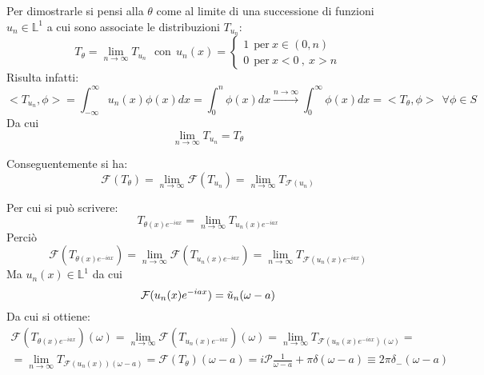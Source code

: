 \documentclass[twoside]{article}
\begin{document}
Per dimostrarle si pensi alla $\theta$ come al limite di una successione di funzioni $u_n \in \mathds{L}^1$ a cui sono associate le distribuzioni $T_{u_{n}}$:
\begin{equation}
    T_{\theta}=\lim_{n\to \infty}T_{u_{n}} \ \ \ \text{con} \ \ u_n(x)= \left\{ \begin{array}{lr}
         1 \ \ \text{per} \ x \in (0,n)  \\
         0 \ \ \text{per} \ x<0 \ , \ x>n
    \end{array}\right.
\end{equation}
Risulta infatti:
\begin{equation}
    <T_{u_{n}},\phi>=\int_{-\infty}^{\infty}u_n(x)\phi(x)dx=\int_{0}^{n}\phi(x)dx \xrightarrow{n \to \infty}\int_0 ^{\infty}\phi(x)dx=<T_{\theta},\phi> \ \ \forall \phi \in S
\end{equation}
Da cui 
\begin{equation}
    \lim_{n\to \infty}T_{u_{n}}=T_{\theta}
\end{equation}

Conseguentemente si ha:
\begin{equation}
    \mathcal{F}(T_{\theta})=\lim_{n\to \infty}\mathcal{F}(T_{u_{n}})=\lim_{n\to \infty}T_{\mathcal{F}(u_{n})}
\end{equation}

Per cui si può scrivere:
\begin{equation}
    T_{\theta(x)e^{-iax}}=\lim_{n\to \infty}T_{u_n(x)e^{-iax}}
\end{equation}
Perciò
\begin{equation}
    \mathcal{F}(T_{\theta(x)e^{-iax}})=\lim_{n\to \infty}\mathcal{F}(T_{u_n(x)e^{-iax}})=\lim_{n\to \infty}T_{\mathcal{F}(u_n(x)e^{-iax})}
\end{equation}
Ma $u_n(x) \in \mathds{L}^1$ da cui
\begin{equation}
    \mathcal{F}(u_n(x)e^{-iax})=\Tilde{u}_n(\omega-a)
\end{equation}
Da cui si ottiene:
\begin{equation}\begin{split}
 \mathcal{F}(T_{\theta(x)e^{-iax}})(\omega)=\lim_{n\to \infty}\mathcal{F}(T_{u_n(x)e^{-iax}})(\omega)=\lim_{n\to \infty}T_{\mathcal{F}(u_n(x)e^{-iax})(\omega)}= \\
 = \lim_{n\to \infty}T_{\mathcal{F}(u_n(x))(\omega-a)}=\mathcal{F}(T_{\theta})(\omega -a)
 =i\mathcal{P}\frac{1}{\omega -a}+\pi \delta(\omega -a)\equiv 2\pi \delta_- (\omega- a)
\end{split}\end{equation}
\end{document}
